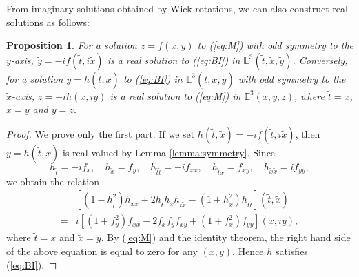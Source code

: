 \documentclass[12pt,amstex]{amsart}%
\theoremstyle{plain} %
\newtheorem{proposition}[theorem]{Proposition}
\theoremstyle{definition}
\begin{document}
From imaginary solutions obtained by Wick rotations, we can also construct real solutions as follows:
 \begin{proposition}\label{prop:BI and M_odd}
For a solution $z=f(x,y)$ to (\ref{eq:M}) with odd symmetry to the $y$-axis, $\tilde{y}=-if(\tilde{t},i\tilde{x})$ is a real solution to (\ref{eq:BI}) in $\mathbb{L}^3(\tilde{t},\tilde{x},\tilde{y})$. Conversely, for a solution $\tilde{y}=h(\tilde{t},\tilde{x})$ to (\ref{eq:BI}) in $\mathbb{L}^3(\tilde{t},\tilde{x},\tilde{y})$ with odd symmetry to the $\tilde{x}$-axis, $z=-ih(x,iy)$ is a real solution to (\ref{eq:M}) in $\mathbb{E}^3(x,y,z)$, where $\tilde{t}=x$, $\tilde{x}=y$ and $\tilde{y}=z$.
\end{proposition}
\begin{proof}
We prove only the first part. If we set $h(\tilde{t},\tilde{x})=-if(\tilde{t},i\tilde{x})$, then $\tilde{y}=h(\tilde{t},\tilde{x})$ is real valued by Lemma \ref{lemma:symmetry}. Since
\[
h_{\tilde{t}}=-if_x,\quad h_{\tilde{x}}=f_y,\quad h_{\tilde{t}\tilde{t}}=-if_{xx},\quad h_{\tilde{t}\tilde{x}}=f_{xy},\quad h_{\tilde{x}\tilde{x}}=if_{yy},
\]
we obtain the relation
\begin{align*}
&\left[(1-h_{\tilde{t}}^2)h_{\tilde{x}\tilde{x}}+2h_{\tilde{t}}h_{\tilde{x}}h_{\tilde{t}\tilde{x}}-(1+h_{\tilde{x}}^2)h_{\tilde{t}\tilde{t}}\right](\tilde{t},\tilde{x})\\
=&i\left[(1+f_y^2)f_{xx}-2f_xf_yf_{xy}+(1+f_x^2)f_{yy}\right](x,iy),
\end{align*}
where $\tilde{t}=x$ and $\tilde{x}=y$.  By (\ref{eq:M}) and the identity theorem, the right hand side of the above equation is equal to zero for any $(x,y)$. Hence $h$ satisfies (\ref{eq:BI}).
\end{proof}
\end{document}

